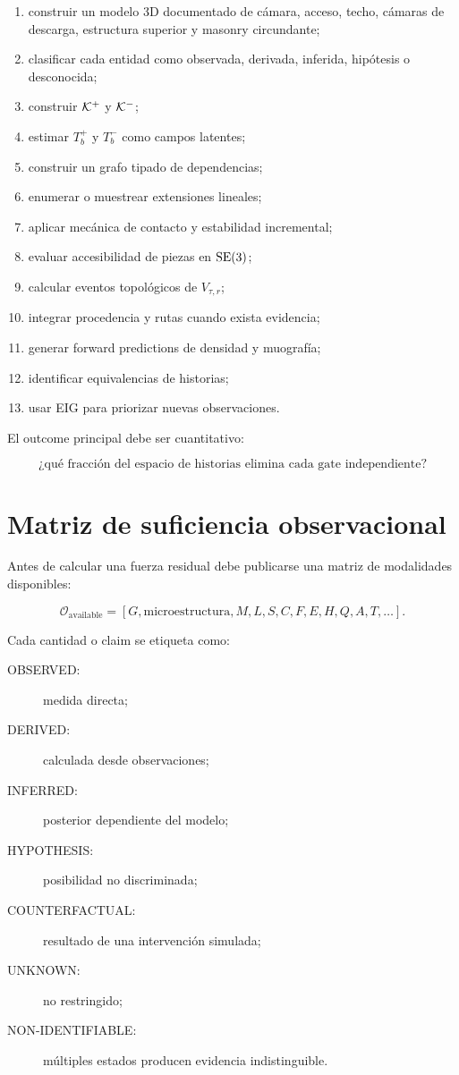 \begin{enumerate}
\item construir un modelo 3D documentado de cámara, acceso, techo, cámaras de descarga, estructura superior y masonry circundante;
\item clasificar cada entidad como observada, derivada, inferida, hipótesis o desconocida;
\item construir \(\mathcal K^{+}\) y \(\mathcal K^{-}\);
\item estimar \(T_b^+\) y \(T_b^-\) como campos latentes;
\item construir un grafo tipado de dependencias;
\item enumerar o muestrear extensiones lineales;
\item aplicar mecánica de contacto y estabilidad incremental;
\item evaluar accesibilidad de piezas en \(\mathrm{SE}(3)\);
\item calcular eventos topológicos de \(V_{\tau,r}\);
\item integrar procedencia y rutas cuando exista evidencia;
\item generar forward predictions de densidad y muografía;
\item identificar equivalencias de historias;
\item usar EIG para priorizar nuevas observaciones.
\end{enumerate}

El outcome principal debe ser cuantitativo:

\begin{equation}
\boxed{
\text{¿qué fracción del espacio de historias elimina cada gate independiente?}
}
\end{equation}

\section{Matriz de suficiencia observacional}

Antes de calcular una fuerza residual debe publicarse una matriz de modalidades disponibles:

\begin{equation}
\mathcal O_{\mathrm{available}}
=
[
G,
\text{microestructura},
M,
L,
S,
C,
F,
E,
H,
Q,
A,
T,
\ldots
].
\end{equation}

Cada cantidad o claim se etiqueta como:

\begin{description}
\item[OBSERVED:] medida directa;
\item[DERIVED:] calculada desde observaciones;
\item[INFERRED:] posterior dependiente del modelo;
\item[HYPOTHESIS:] posibilidad no discriminada;
\item[COUNTERFACTUAL:] resultado de una intervención simulada;
\item[UNKNOWN:] no restringido;
\item[NON-IDENTIFIABLE:] múltiples estados producen evidencia indistinguible.
\end{description}


